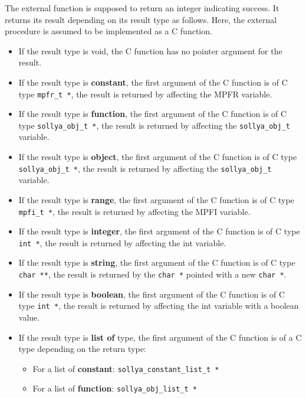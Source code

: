 \begin{itemize}
   The external function is supposed to return an integer indicating success. It
   returns its result depending on its \sollya result type as follows. Here, the
   external procedure is assumed to be implemented as a C function.\begin{itemize}
     \item If the \sollya result type is void, the C function has no pointer
        argument for the result.
     \item If the \sollya result type is \textbf{constant}, the first argument of the
        C function is of C type \texttt{mpfr\_t *}, the result is returned by affecting
        the MPFR variable.
     \item If the \sollya result type is \textbf{function}, the first argument of the
        C function is of C type \texttt{sollya\_obj\_t *}, the result is returned by
        affecting the \texttt{sollya\_obj\_t} variable.
     \item If the \sollya result type is \textbf{object}, the first argument of the
        C function is of C type \texttt{sollya\_obj\_t *}, the result is returned by
        affecting the \texttt{sollya\_obj\_t} variable.
     \item If the \sollya result type is \textbf{range}, the first argument of the C function
        is of C type \texttt{mpfi\_t *}, the result is returned by affecting the MPFI
        variable.
     \item If the \sollya result type is \textbf{integer}, the first argument of the
        C function is of C type \texttt{int *}, the result is returned by affecting the
        int variable.
     \item If the \sollya result type is \textbf{string}, the first argument of the
        C function is of C type \texttt{char **}, the result is returned by the \texttt{char *}
        pointed with a new \texttt{char *}.
     \item If the \sollya result type is \textbf{boolean}, the first argument of the
        C function is of C type \texttt{int *}, the result is returned by affecting the
        int variable with a boolean value.
     \item If the \sollya result type is \textbf{list of} type, the first argument of the
        C function is of a C type depending on the \sollya return type:\begin{itemize}
          \item For a list of \textbf{constant}: \verb|sollya_constant_list_t *|
          \item For a list of \textbf{function}: \verb|sollya_obj_list_t *|

\end{itemize}
\end{itemize}
\end{itemize}
